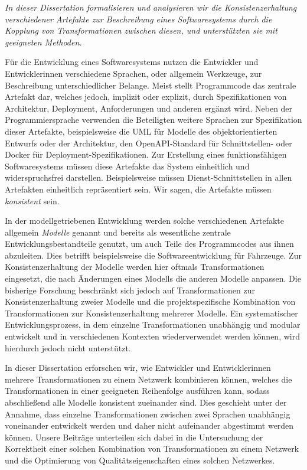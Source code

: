 \emph{In dieser Dissertation formalisieren und analysieren wir die Konsistenzerhaltung verschiedener Artefakte zur Beschreibung eines Softwaresystems durch die Kopplung von Transformationen zwischen diesen, und unterstützten sie mit geeigneten Methoden.}

Für die Entwicklung eines Softwaresystems nutzen die Entwickler und Entwicklerinnen verschiedene Sprachen, oder allgemein Werkzeuge, zur Beschreibung unterschiedlicher Belange.
Meist stellt Programmcode das zentrale Artefakt dar, welches jedoch, implizit oder explizit, durch Spezifikationen von Architektur, Deployment, Anforderungen und anderen ergänzt wird.
Neben der Programmiersprache verwenden die Beteiligten weitere Sprachen zur Spezifikation dieser Artefakte, beispielsweise die \acrshort{UML} für Modelle des objektorientierten Entwurfs oder der Architektur, den OpenAPI-Standard für Schnittstellen- oder Docker für Deployment-Spezifikationen.
Zur Erstellung eines funktionsfähigen Softwaresystems müssen diese Artefakte das System einheitlich und widerspruchsfrei darstellen.
Beispielsweise müssen Dienst-Schnittstellen in allen Artefakten einheitlich repräsentiert sein.
Wir sagen, die Artefakte müssen \emph{konsistent} sein.

In der modellgetriebenen Entwicklung werden solche verschiedenen Artefakte allgemein \emph{Modelle} genannt und bereits als wesentliche zentrale Entwicklungsbestandteile genutzt, um auch Teile des Programmcodes aus ihnen abzuleiten.
Dies betrifft beispielsweise die Softwareentwicklung für Fahrzeuge. %
Zur Konsistenzerhaltung der Modelle werden hier oftmals Transformationen eingesetzt, die nach Änderungen eines Modells die anderen Modelle anpassen.
Die bisherige Forschung beschränkt sich jedoch auf Transformationen zur Konsistenzerhaltung zweier Modelle %
und die projektspezifische Kombination von Transformationen zur Konsistenzerhaltung mehrerer Modelle. %
Ein systematischer Entwicklungsprozess, in dem einzelne Transformationen unabhängig und modular entwickelt und in verschiedenen Kontexten wiederverwendet werden können, wird hierdurch jedoch nicht unterstützt.

In dieser Dissertation erforschen wir, wie Entwickler und Entwicklerinnen mehrere Transformationen zu einem Netzwerk kombinieren können, welches die Transformationen in einer geeigneten Reihenfolge ausführen kann, sodass abschließend alle Modelle konsistent zueinander sind. %
Dies geschieht unter der Annahme, dass einzelne Transformationen zwischen zwei Sprachen unabhängig voneinander entwickelt werden und daher nicht aufeinander abgestimmt werden können.
Unsere Beiträge unterteilen sich dabei in die Untersuchung der Korrektheit einer solchen Kombination von Transformationen zu einem Netzwerk und die Optimierung von Qualitätseigenschaften eines solchen Netzwerkes.

